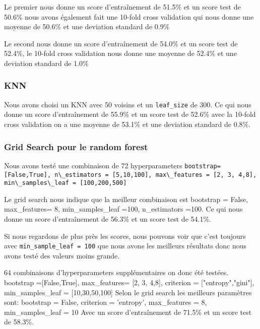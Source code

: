 Le premier nous donne un score d'entraînement de 51.5\% et un score test de 50.6\% nous avons également fait une 10-fold cross validation qui nous donne une moyenne de 50.6\% et une deviation standard de 0.9\%

Le second nous donne un score d'entraînement de 54.0\% et un score test de 52.4\%, le 10-fold cross validation nous donne une moyenne de 52.4\% et une deviation standard de 1.0\%

\subsubsection{KNN}
Nous avons choisi un KNN avec 50 voisins et un \lstinline!leaf_size! de 300. Ce qui nous donne un score d'entraînement de 55.9\% et un score test de 52.6\% avec la 10-fold cross validation on a une moyenne de 53.1\% et une deviation standard de 0.8\%.

\subsubsection{Grid Search pour le random forest}
Nous avons testé une combinaison de 72 hyperparameters \newline
\lstinline!bootstrap= [False,True], n\_estimators = [5,10,100], max\_features = [2, 3, 4,8], min\_samples\_leaf = [100,200,500]! \newline

Le grid search nous indique que la meilleur combinaison est bootstrap = False, max\_features= 8, min\_samples\_leaf =100, n\_estimators =100. \newline
Ce qui nous donne un score d'entraînement de 56.3\% et un score test de 54.1\%.

Si nous regardons de plus près les scores, nous pouvons voir que c'est toujours avec \lstinline!min_sample_leaf = 100! que nous avons les meilleurs résultats donc nous avons testé des valeurs moins grande.

64 combinaisons d'hyperparameters supplémentaires on donc été testées.\newline
bootstrap =[False,True], max\_features= [2, 3, 4,8], criterion = ["entropy","gini"], min\_samples\_leaf =  [10,30,50,100] \newline
Selon le grid search les meilleurs paramètres sont: bootstrap = False, criterion = 'entropy', max\_features = 8, min\_samples\_leaf = 10 \newline
Avec un score d'entraînement de 71.5\% et un score test de 58.3\%.

